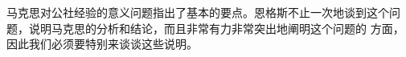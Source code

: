 
\mbox{}

\mbox{}

马克思对公社经验的意义问题指出了基本的要点。恩格斯不止一次地谈到这个问题，说明马克思的分析和结论，而且非常有力非常突出地阐明这个问题的 方面，因此我们必须要特别来谈谈这些说明。
